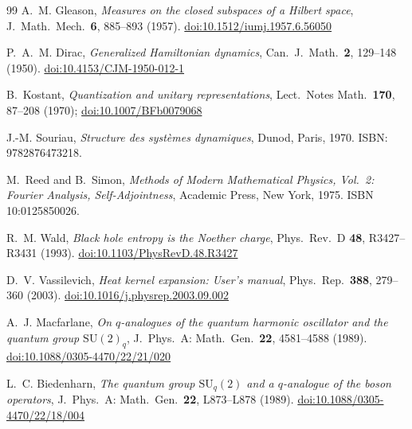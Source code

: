 \documentclass[11pt,a4paper]{article}
\theoremstyle{definition}
\theoremstyle{remark}
\begin{document}
\begin{thebibliography}{99}
A.~M. Gleason,
\textit{Measures on the closed subspaces of a Hilbert space},
J.\ Math.\ Mech.\ \textbf{6}, 885--893 (1957).
\href{https://doi.org/10.1512/iumj.1957.6.56050}{doi:10.1512/iumj.1957.6.56050}

P.~A.~M. Dirac,
\textit{Generalized Hamiltonian dynamics},
Can.\ J.\ Math.\ \textbf{2}, 129--148 (1950).
\href{https://doi.org/10.4153/CJM-1950-012-1}{doi:10.4153/CJM-1950-012-1}

B.~Kostant,
\textit{Quantization and unitary representations},
Lect.\ Notes Math.\ \textbf{170}, 87--208 (1970);
\href{https://doi.org/10.1007/BFb0079068}{doi:10.1007/BFb0079068}

J.-M. Souriau,
\textit{Structure des syst\`emes dynamiques},
Dunod, Paris, 1970.
ISBN: 9782876473218.

M.~Reed and B.~Simon,
\textit{Methods of Modern Mathematical Physics, Vol.~2: Fourier Analysis,
Self-Adjointness},
Academic Press, New York, 1975.
ISBN 10:0125850026.

R.~M. Wald,
\textit{Black hole entropy is the Noether charge},
Phys.\ Rev.\ D \textbf{48}, R3427--R3431 (1993).
\href{https://doi.org/10.1103/PhysRevD.48.R3427}{doi:10.1103/PhysRevD.48.R3427}

D.~V. Vassilevich,
\textit{Heat kernel expansion: User's manual},
Phys.\ Rep.\ \textbf{388}, 279--360 (2003).
\href{https://doi.org/10.1016/j.physrep.2003.09.002}{doi:10.1016/j.physrep.2003.09.002}

A.~J. Macfarlane,
\textit{On $q$-analogues of the quantum harmonic oscillator and the
  quantum group $\mathrm{SU}(2)_q$},
J.\ Phys.\ A: Math.\ Gen.\ \textbf{22}, 4581--4588 (1989).
\href{https://doi.org/10.1088/0305-4470/22/21/020}{doi:10.1088/0305-4470/22/21/020}

L.~C. Biedenharn,
\textit{The quantum group $\mathrm{SU}_q(2)$ and a $q$-analogue of the
  boson operators},
J.\ Phys.\ A: Math.\ Gen.\ \textbf{22}, L873--L878 (1989).
\href{https://doi.org/10.1088/0305-4470/22/18/004}{doi:10.1088/0305-4470/22/18/004}

\end{thebibliography}
\end{document}

